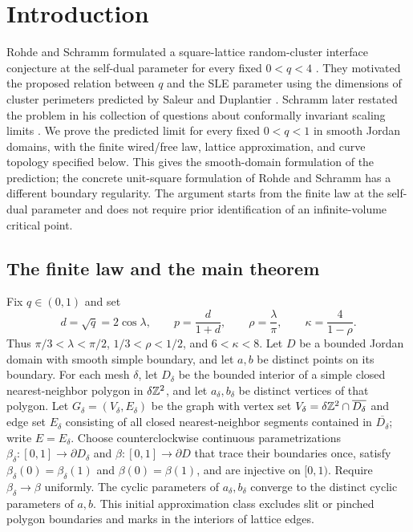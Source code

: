 \section{Introduction}\label{sec:introduction}

Rohde and Schramm formulated a square-lattice random-cluster interface
conjecture at the self-dual parameter for every fixed $0<q<4$
\cite[Conjecture~9.7 and the following discussion]{RohdeSchramm2005}.
They motivated the proposed relation between $q$ and the SLE parameter
using the dimensions of cluster perimeters predicted by Saleur and
Duplantier \cite{SaleurDuplantier1987}.  Schramm later restated the
problem in his collection of questions about conformally invariant
scaling limits \cite[Problem~2.6]{Schramm2006}.
We prove the predicted limit for every fixed $0<q<1$ in smooth
Jordan domains, with the finite wired/free law, lattice approximation,
and curve topology specified below. This gives the smooth-domain
formulation of the prediction; the concrete unit-square formulation of
Rohde and Schramm has a different boundary regularity. The argument
starts from the finite law at the self-dual parameter and does not
require prior identification of an infinite-volume critical point.

\subsection{The finite law and the main theorem}

Fix $q\in(0,1)$ and set
\begin{equation}\label{eq:parameters}
 d=\sqrt q=2\cos\lambda,
 \qquad p=\frac{d}{1+d},
 \qquad \rho=\frac{\lambda}{\pi},
 \qquad \kappa=\frac4{1-\rho}.
\end{equation}
Thus $\pi/3<\lambda<\pi/2$, $1/3<\rho<1/2$, and
$6<\kappa<8$. Let $D$ be a bounded Jordan domain with smooth simple
boundary, and let $a,b$ be distinct points on its boundary.
For each mesh $\delta$, let $D_\delta$ be the bounded interior of a
simple closed nearest-neighbor polygon in $\delta\mathbb Z^2$, and let
$a_\delta,b_\delta$ be distinct vertices of that polygon. Let
$G_\delta=(V_\delta,E_\delta)$ be the graph with vertex set
$V_\delta=\delta\mathbb Z^2\cap\overline{D_\delta}$ and edge set
$E_\delta$ consisting of all closed nearest-neighbor segments contained
in $\overline{D_\delta}$; write $E=E_\delta$.
Choose counterclockwise continuous parametrizations
$\beta_\delta:[0,1]\to\partial D_\delta$ and
$\beta:[0,1]\to\partial D$ that trace their boundaries once, satisfy
$\beta_\delta(0)=\beta_\delta(1)$ and $\beta(0)=\beta(1)$, and are
injective on $[0,1)$. Require
$\beta_\delta\to\beta$ uniformly. The cyclic parameters of
$a_\delta,b_\delta$ converge to the distinct cyclic parameters of
$a,b$. This initial approximation class excludes slit or pinched
polygon boundaries and marks in the interiors of lattice edges.

